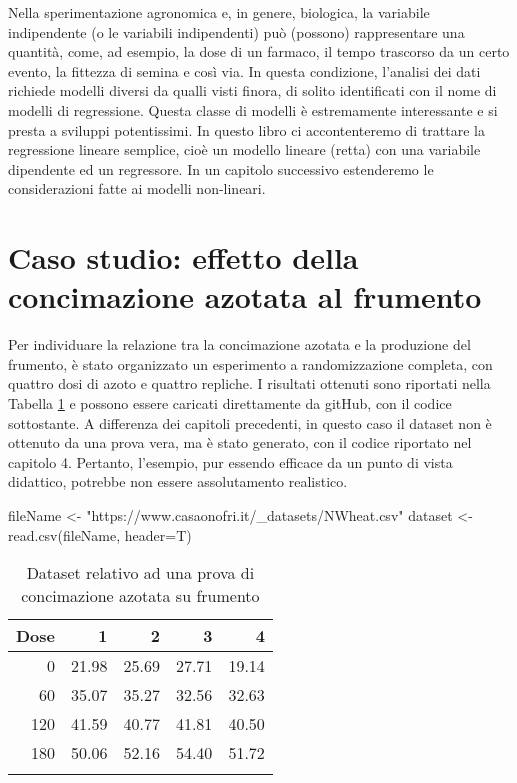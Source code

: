 \documentclass[a4paper,12pt,oneside]{book}
\newenvironment{Shaded}{\begin{snugshade}}{\end{snugshade}}
\newcommand{\StringTok}[1]{#1}
\newcommand{\OtherTok}[1]{#1}
\newcommand{\FunctionTok}[1]{#1}
\newcommand{\AttributeTok}[1]{#1}
\newcommand{\NormalTok}[1]{#1}
\begin{document}
Nella sperimentazione agronomica e, in genere, biologica, la variabile indipendente (o le variabili indipendenti) può (possono) rappresentare una quantità, come, ad esempio, la dose di un farmaco, il tempo trascorso da un certo evento, la fittezza di semina e così via. In questa condizione, l'analisi dei dati richiede modelli diversi da qualli visti finora, di solito identificati con il nome di modelli di regressione. Questa classe di modelli è estremamente interessante e si presta a sviluppi potentissimi. In questo libro ci accontenteremo di trattare la regressione lineare semplice, cioè un modello lineare (retta) con una variabile dipendente ed un regressore. In un capitolo successivo estenderemo le considerazioni fatte ai modelli non-lineari.

\hypertarget{caso-studio-effetto-della-concimazione-azotata-al-frumento}{%
\section{Caso studio: effetto della concimazione azotata al frumento}\label{caso-studio-effetto-della-concimazione-azotata-al-frumento}}

Per individuare la relazione tra la concimazione azotata e la produzione del frumento, è stato organizzato un esperimento a randomizzazione completa, con quattro dosi di azoto e quattro repliche. I risultati ottenuti sono riportati nella Tabella \ref{tab:tabName141} e possono essere caricati direttamente da gitHub, con il codice sottostante. A differenza dei capitoli precedenti, in questo caso il dataset non è ottenuto da una prova vera, ma è stato generato, con il codice riportato nel capitolo 4. Pertanto, l'esempio, pur essendo efficace da un punto di vista didattico, potrebbe non essere assolutamento realistico.

\begin{Shaded}
\begin{Highlighting}[]
\NormalTok{fileName }\OtherTok{\textless{}{-}} \StringTok{"https://www.casaonofri.it/\_datasets/NWheat.csv"}
\NormalTok{dataset }\OtherTok{\textless{}{-}} \FunctionTok{read.csv}\NormalTok{(fileName, }\AttributeTok{header=}\NormalTok{T)}
\end{Highlighting}
\end{Shaded}

\begin{table}

\caption{\label{tab:tabName141}Dataset relativo ad una prova di concimazione azotata su frumento}
\centering
\begin{tabular}[t]{rrrrr}
\toprule{}
Dose & 1 & 2 & 3 & 4\\
\midrule{}
0 & 21.98 & 25.69 & 27.71 & 19.14\\
60 & 35.07 & 35.27 & 32.56 & 32.63\\
120 & 41.59 & 40.77 & 41.81 & 40.50\\
180 & 50.06 & 52.16 & 54.40 & 51.72\\
\bottomrule{}
\end{tabular}
\end{table}
\end{document}
